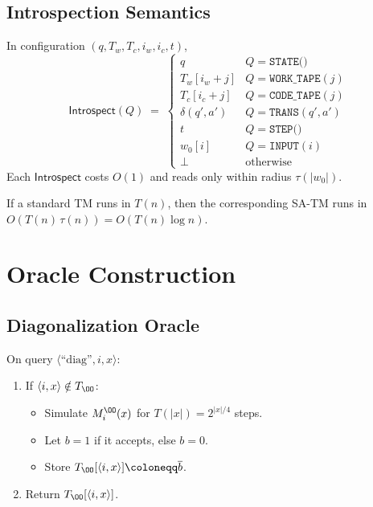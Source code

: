 \documentclass[12pt]{article}
\begin{document}
\subsection{Introspection Semantics}
\begin{definition}
In configuration $(q,T_w,T_c,i_w,i_c,t)$, 
\[
\mathsf{Introspect}(Q)\;=\;
\begin{cases}
q & Q=\texttt{STATE()}\\
T_w[i_w+j] & Q=\texttt{WORK\_TAPE}(j)\\
T_c[i_c+j] & Q=\texttt{CODE\_TAPE}(j)\\
\delta(q',a') & Q=\texttt{TRANS}(q',a')\\
t & Q=\texttt{STEP()}\\
w_0[i] & Q=\texttt{INPUT}(i)\\
\bot & \text{otherwise}
\end{cases}
\]
Each $\mathsf{Introspect}$ costs $O(1)$ and reads only within radius $\tau(|w_0|)$.
\end{definition}

\begin{lemma}[SA-TM Overhead]
If a standard TM runs in $T(n)$, then the corresponding SA-TM runs in $O(T(n)\,\tau(n))=O(T(n)\log n)$.
\end{lemma}

\section{Oracle Construction}
\subsection{Diagonalization Oracle}
\begin{definition}[Oracle $\OO$]
On query $\langle\text{“diag”},i,x\rangle$:
\begin{enumerate}
  \item If $\langle i,x\rangle\notin T_{\OO}$:
    \begin{itemize}
      \item Simulate $M_i^{\OO}(x)$ for $T(|x|)=2^{|x|/4}$ steps.
      \item Let $b=1$ if it accepts, else $b=0$.
      \item Store $T_{\OO}[\langle i,x\rangle]\coloneqq\overline{b}$.
    \end{itemize}
  \item Return $T_{\OO}[\langle i,x\rangle]$.
\end{enumerate}
\end{definition}
\end{document}
